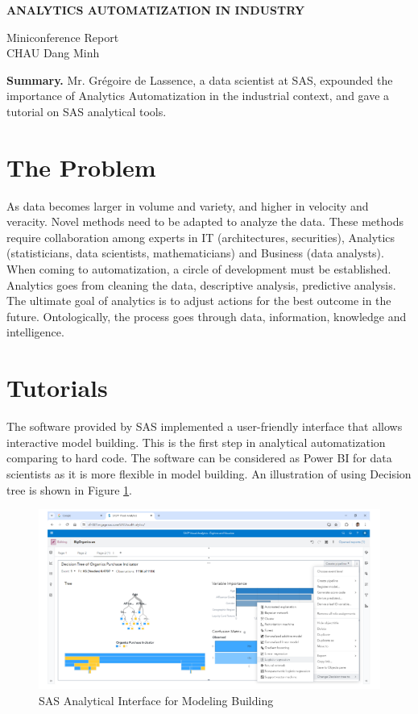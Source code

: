 \begin{center}
    \textbf{\Large ANALYTICS AUTOMATIZATION IN INDUSTRY} \\
    \vspace{0.5cm}

    Miniconference Report \\
    CHAU Dang Minh
\end{center}

\begin{center}
    \begin{minipage}{0.85\textwidth}
        \textbf{Summary.} Mr. Grégoire de Lassence, a data scientist at SAS, expounded the importance of Analytics Automatization in the industrial context, and gave a tutorial on SAS analytical tools.
    \end{minipage}
\end{center}

\section{The Problem}
As data becomes larger in volume and variety, and higher in velocity and veracity. Novel methods need to be adapted to analyze the data. These methods require collaboration among experts in IT (architectures, securities), Analytics (statisticians, data scientists, mathematicians) and Business (data analysts). When coming to automatization, a circle of development must be established. Analytics goes from cleaning the data, descriptive analysis, predictive analysis. The ultimate goal of analytics is to adjust actions for the best outcome in the future. Ontologically, the process goes through data, information, knowledge and intelligence.

\section{Tutorials}
The software provided by SAS implemented a user-friendly interface that allows interactive model building. This is the first step in analytical automatization comparing to hard code. The software can be considered as Power BI for data scientists as it is more flexible in model building. An illustration of using Decision tree is shown in Figure \ref{fig:sas}.

\begin{figure}[ht]
    \centering
    \includegraphics[width=\textwidth]{img/sas.png}
    \caption{SAS Analytical Interface for Modeling Building}
    \label{fig:sas}
\end{figure}

